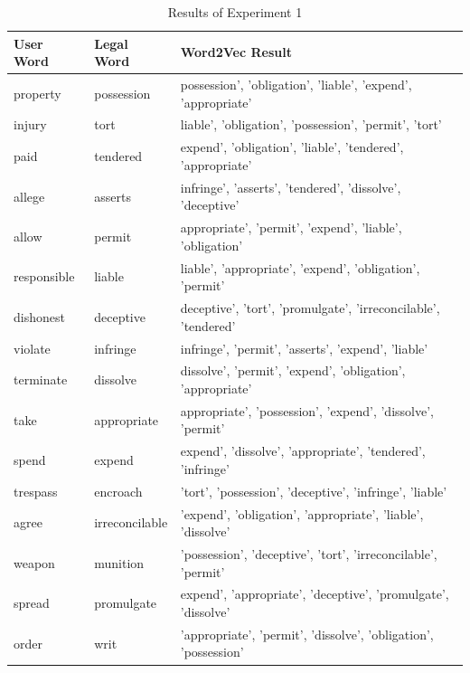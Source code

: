 \documentclass[11pt]{article}
\begin{document}
\begin{table}
\small
  \centering
  \caption{Results of Experiment 1}
    \begin{tabular}{|l|l|p{3cm}|}
    \hline
    \textbf{User Word} & \textbf{Legal Word} & \textbf{Word2Vec Result} \\
    \hline
    property & possession & possession', 'obligation', 'liable', 'expend', 'appropriate' \\
    \hline
    injury & tort  & liable', 'obligation', 'possession', 'permit', 'tort' \\
    \hline
    paid  & tendered & expend', 'obligation', 'liable', 'tendered', 'appropriate' \\
    \hline
    allege & asserts & infringe', 'asserts', 'tendered', 'dissolve', 'deceptive' \\
    \hline
    allow & permit & appropriate', 'permit', 'expend', 'liable', 'obligation' \\
    \hline
    responsible & liable & liable', 'appropriate', 'expend', 'obligation', 'permit' \\
    \hline
    dishonest & deceptive & deceptive', 'tort', 'promulgate', 'irreconcilable', 'tendered' \\
    \hline
    violate & infringe & infringe', 'permit', 'asserts', 'expend', 'liable' \\
    \hline
    terminate & dissolve & dissolve', 'permit', 'expend', 'obligation', 'appropriate' \\
    \hline
    take  & appropriate & appropriate', 'possession', 'expend', 'dissolve', 'permit' \\
    \hline
    spend & expend & expend', 'dissolve', 'appropriate', 'tendered', 'infringe' \\
    \hline
    trespass & encroach & 'tort', 'possession', 'deceptive', 'infringe', 'liable' \\
    \hline
    agree & irreconcilable & 'expend', 'obligation', 'appropriate', 'liable', 'dissolve' \\
    \hline
    weapon & munition & 'possession', 'deceptive', 'tort', 'irreconcilable', 'permit' \\
    \hline
    spread & promulgate & expend', 'appropriate', 'deceptive', 'promulgate', 'dissolve' \\
    \hline
    order & writ  & 'appropriate', 'permit', 'dissolve', 'obligation', 'possession' \\
    \hline
    \end{tabular}%
  \label{tab:Table1}%
\end{table}%
\end{document}
